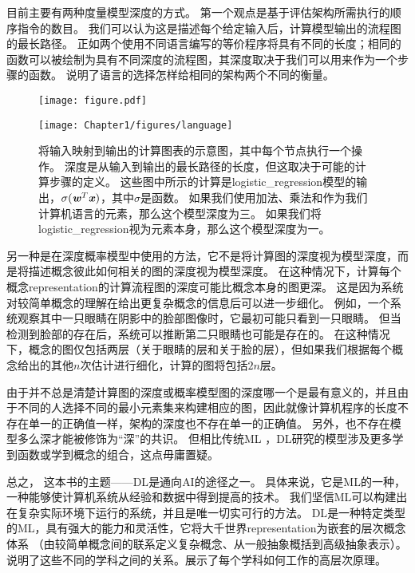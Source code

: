 
目前主要有两种度量模型深度的方式。
第一个观点是基于评估架构所需执行的顺序指令的数目。
我们可以认为这是描述每个给定输入后，计算模型输出的流程图的最长路径。
正如两个使用不同语言编写的等价程序将具有不同的长度；相同的函数可以被绘制为具有不同深度的流程图，其深度取决于我们可以用来作为一个步骤的函数。
说明了语言的选择怎样给相同的架构两个不同的衡量。

\begin{figure}[!htb]
\ifOpenSource
\centerline{\texttt{[image: figure.pdf]}}
\else
\centerline{\texttt{[image: Chapter1/figures/language]}}
\fi
\caption{将输入映射到输出的计算图表的示意图，其中每个节点执行一个操作。
深度是从输入到输出的最长路径的长度，但这取决于可能的计算步骤的定义。
这些图中所示的计算是\gls{logistic_regression}模型的输出，$\sigma(\boldsymbol{\mathit{w}}^T \boldsymbol{\mathit{x}})$，其中$\sigma$是函数。
如果我们使用加法、乘法和作为我们计算机语言的元素，那么这个模型深度为三。
如果我们将\gls{logistic_regression}视为元素本身，那么这个模型深度为一。
}
\label{fig:chap1_language}
\end{figure}

另一种是在深度概率模型中使用的方法，它不是将计算图的深度视为模型深度，而是将描述概念彼此如何相关的图的深度视为模型深度。
在这种情况下，计算每个概念\gls{representation}的计算流程图的深度可能比概念本身的图更深。
这是因为系统对较简单概念的理解在给出更复杂概念的信息后可以进一步细化。
例如，一个系统观察其中一只眼睛在阴影中的脸部图像时，它最初可能只看到一只眼睛。
但当检测到脸部的存在后，系统可以推断第二只眼睛也可能是存在的。
在这种情况下，概念的图仅包括两层（关于眼睛的层和关于脸的层），但如果我们根据每个概念给出的其他$n$次估计进行细化，计算的图将包括$2n$层。


由于并不总是清楚计算图的深度或概率模型图的深度哪一个是最有意义的，并且由于不同的人选择不同的最小元素集来构建相应的图，因此就像计算机程序的长度不存在单一的正确值一样，架构的深度也不存在单一的正确值。
另外，也不存在模型多么深才能被修饰为``深''的共识。
但相比传统\gls{ML} ，\gls{DL}研究的模型涉及更多学到函数或学到概念的组合，这点毋庸置疑。

总之， 这本书的主题——\gls{DL}是通向\gls{AI}的途径之一。
具体来说，它是\gls{ML}的一种，一种能够使计算机系统从经验和数据中得到提高的技术。
我们坚信\gls{ML}可以构建出在复杂实际环境下运行的系统，并且是唯一切实可行的方法。
\gls{DL}是一种特定类型的\gls{ML}，具有强大的能力和灵活性，它将大千世界\gls{representation}为嵌套的层次概念体系
（由较简单概念间的联系定义复杂概念、从一般抽象概括到高级抽象表示）。
说明了这些不同的学科之间的关系。展示了每个学科如何工作的高层次原理。

